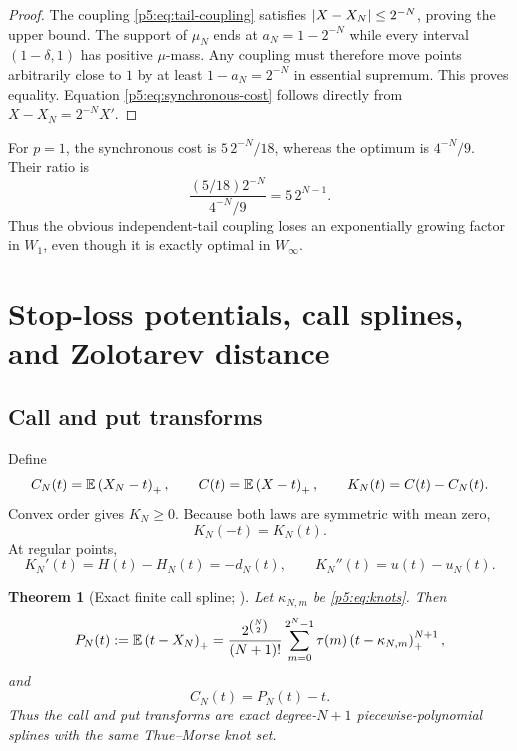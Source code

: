 \documentclass[11pt,oneside]{article}
\numberwithin{equation}{section}
\newtheorem{theorem}{Theorem}[section]
\theoremstyle{definition}
\theoremstyle{remark}
\newcommand{\E}{\mathbb E}
\begin{document}
\begin{proof}
The coupling \eqref{p5:eq:tail-coupling} satisfies $\left\lvert X-X_N\right\rvert\le2^{-N}$, proving the upper bound.  The support of $\mu_N$ ends at $a_N=1-2^{-N}$ while every interval $(1-\delta,1)$ has positive $\mu$-mass.  Any coupling must therefore move points arbitrarily close to $1$ by at least $1-a_N=2^{-N}$ in essential supremum.  This proves equality.  Equation \eqref{p5:eq:synchronous-cost} follows directly from $X-X_N=2^{-N}X'$.
\end{proof}

For $p=1$, the synchronous cost is $5\,2^{-N}/18$, whereas the optimum is $4^{-N}/9$.  Their ratio is
\begin{equation}
 \frac{(5/18)2^{-N}}{4^{-N}/9}=5\,2^{N-1}.
 \label{p5:eq:coupling-ratio}
\end{equation}
Thus the obvious independent-tail coupling loses an exponentially growing factor in $W_1$, even though it is exactly optimal in $W_\infty$.

\section{Stop-loss potentials, call splines, and Zolotarev distance}
\label{p5:sec:stoploss}

\subsection{Call and put transforms}

Define
\begin{equation}
 C_N(t)=\E\pos{X_N-t},
 \qquad
 C(t)=\E\pos{X-t},
 \qquad
 K_N(t)=C(t)-C_N(t).
 \label{p5:eq:call-def}
\end{equation}
Convex order gives $K_N\ge0$.  Because both laws are symmetric with mean zero,
\begin{equation}
 K_N(-t)=K_N(t).
 \label{p5:eq:K-even}
\end{equation}
At regular points,
\begin{equation}
 K_N'(t)=H(t)-H_N(t)=-d_N(t),
 \qquad
 K_N''(t)=u(t)-u_N(t).
 \label{p5:eq:K-derivatives}
\end{equation}

\begin{theorem}[Exact finite call spline; \newresult]
Let $\kappa_{N,m}$ be \eqref{p5:eq:knots}.  Then
\begin{equation}
 P_N(t):=\E\pos{t-X_N}
 =\frac{2^{\binom N2}}{(N+1)!}
 \sum_{m=0}^{2^N-1}\tau(m)\pos{t-\kappa_{N,m}}^{N+1},
 \label{p5:eq:put-spline}
\end{equation}
and
\begin{equation}
 C_N(t)=P_N(t)-t.
 \label{p5:eq:call-spline}
\end{equation}
Thus the call and put transforms are exact degree-$N+1$ piecewise-polynomial splines with the same Thue--Morse knot set.
\end{theorem}
\end{document}
